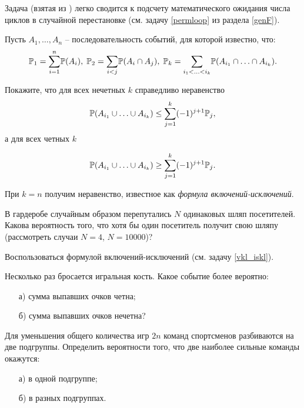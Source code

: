 \begin{ordre}
Задача (взятая из \cite{book2012}) легко сводится к подсчету математического ожидания числа циклов в случайной перестановке (см. задачу \ref{permloop} из раздела \ref{genF}). 
\end{ordre}


\begin{problem}
\label{vkl_iskl}
Пусть $A_1,\ldots,A_n$ -- последовательность событий, для которой известно, что:
\[
\mathrm{{\mathbb P}}_1 = \underset{i = 1}{\overset{n}{\sum}} \mathrm{{\mathbb P}}(A_i), \;
\mathrm{{\mathbb P}}_2 = \underset{i < j}{\sum} \mathrm{{\mathbb P}}(A_i \cap A_j), \;
\mathrm{{\mathbb P}}_k = \underset{i_1 < \ldots < i_k}{\sum} \mathrm{{\mathbb P}}(A_{i_1} \cap \ldots \cap A_{i_k}).
\]

 Покажите, что для всех нечетных $k$ справедливо неравенство
 \[
 \mathrm{{\mathbb P}}(A_{i_1} \cup \ldots \cup A_{i_k}) \leq \underset{j = 1}{\overset{k}{\sum}} (-1)^{j+1}\mathrm{{\mathbb P}}_j,    
 \]
  а для всех четных $k$
 
 \[
 \mathrm{{\mathbb P}}(A_{i_1} \cup \ldots \cup A_{i_k}) \geq \underset{j = 1}{\overset{k}{\sum}} (-1)^{j+1}\mathrm{{\mathbb P}}_j.	
 \]

 
\end{problem}

\begin{remark}
При $k=n$ получим неравенство, известное как \textit{формула включений-исключений}.
\end{remark}

\begin{problem}
В гардеробе случайным образом перепутались $N$ одинаковых шляп посетителей. Какова вероятность того, что хотя бы один посетитель получит свою шляпу (рассмотреть случаи $N=4$, $N=10000$)?  
\end{problem}

\begin{ordre}
Воспользоваться формулой включений-исключений (см. задачу \ref{vkl_iskl}).
\end{ordre}

\begin{problem}
Несколько раз бросается игральная кость. Какое событие более вероятно: 
\begin{enumerate}
\item[а)] сумма выпавших очков четна; 
\item[б)] сумма выпавших очков нечетна? 
\end{enumerate}
\end{problem}


\begin{problem}
Для уменьшения общего количества игр $2n$ команд спортсменов разбиваются на две подгруппы. Определить вероятности того, что 
две наиболее сильные команды окажутся: 
\begin{enumerate}
\item[а)] в одной подгруппе; 
\item[б)] в разных подгруппах. 
\end{enumerate}
\end{problem}


